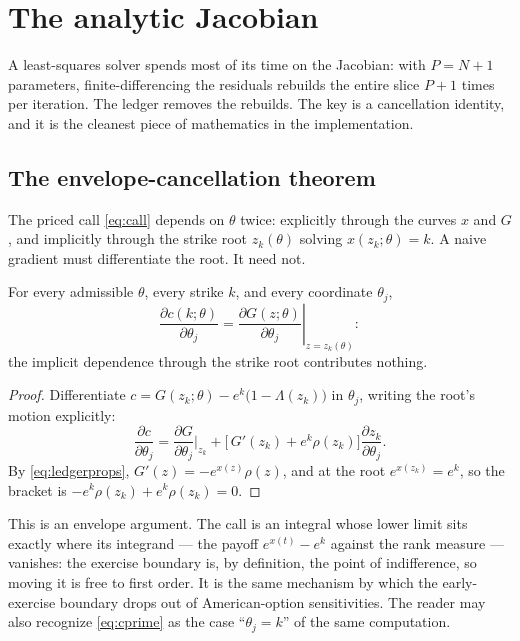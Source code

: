 \section{The analytic Jacobian}
\label{sec:jacobian}

A least-squares solver spends most of its time on the Jacobian: with
$P=N+1$ parameters, finite-differencing the residuals rebuilds the entire
slice $P+1$ times per iteration.  The ledger removes the rebuilds.  The
key is a cancellation identity, and it is the cleanest piece of
mathematics in the implementation.

\subsection{The envelope-cancellation theorem}

The priced call \eqref{eq:call} depends on $\theta$ twice: explicitly
through the curves $x$ and $G$, and implicitly through the strike root
$z_k(\theta)$ solving $x(z_k;\theta)=k$.  A naive gradient must
differentiate the root.  It need not.

\begin{theorem}
\label{thm:envelope}
For every admissible $\theta$, every strike $k$, and every coordinate
$\theta_j$,
\begin{equation}
\frac{\partial c(k;\theta)}{\partial\theta_j}
=\left.\frac{\partial G(z;\theta)}{\partial\theta_j}
\right|_{z=z_k(\theta)} :
\label{eq:envelope}
\end{equation}
the implicit dependence through the strike root contributes nothing.
\end{theorem}

\begin{proof}
Differentiate $c=G(z_k;\theta)-e^{k}\big(1-\Lambda(z_k)\big)$ in
$\theta_j$, writing the root's motion explicitly:
\[
\frac{\partial c}{\partial\theta_j}
=\frac{\partial G}{\partial\theta_j}\Big|_{z_k}
+\Big[\,G'(z_k)+e^{k}\rho(z_k)\Big]
\frac{\partial z_k}{\partial\theta_j} .
\]
By \eqref{eq:ledgerprops}, $G'(z)=-e^{x(z)}\rho(z)$, and at the root
$e^{x(z_k)}=e^{k}$, so the bracket is
$-e^{k}\rho(z_k)+e^{k}\rho(z_k)=0$.
\end{proof}

\begin{remark}
This is an envelope argument.  The call is an integral whose lower limit
sits exactly where its integrand --- the payoff $e^{x(t)}-e^{k}$ against
the rank measure --- vanishes: the exercise boundary is, by definition,
the point of indifference, so moving it is free to first order.  It is
the same mechanism by which the early-exercise boundary drops out of
American-option sensitivities.  The reader may also recognize
\eqref{eq:cprime} as the case ``$\theta_j=k$'' of the same computation.
\end{remark}

